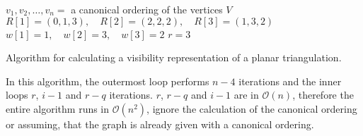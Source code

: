 \documentclass[a4paper,12pt,headsepline]{scrartcl}
\begin{document}
\begin{enumerate}[a)]
    \begin{algorithm}[H]
      \SetAlgoLined
      $v_1,v_2,\dots,v_n=$ a canonical ordering of the vertices $V$\;
      $R[1] = (0,1,3),\quad R[2] = (2,2,2),\quad R[3] = (1,3,2)$\;
      $w[1] = 1,\quad w[2] = 3,\quad w[3] = 2$\;
      $r = 3$\;
      \caption{Algorithm for calculating a visibility representation of a planar triangulation.}
    \end{algorithm}

    In this algorithm, the outermost loop performs $n-4$ iterations and the inner loops $r$, $i-1$ and $r-q$ iterations.
    $r$, $r-q$ and $i-1$ are in $\mathcal{O}(n)$, therefore the entire algorithm runs in $\mathcal{O}(n^2)$, ignore the calculation of the canonical ordering or assuming, that the graph is already given with a canonical ordering.
\end{enumerate}
\end{document}
